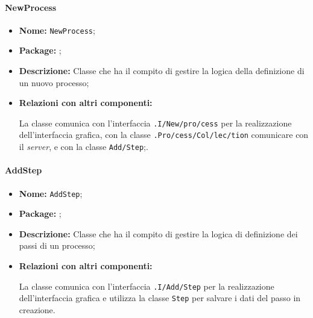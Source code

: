 \paragraph{NewProcess}
\begin{flushleft}
\begin{itemize}
\item \textbf{Nome:} \texttt{NewProcess};
\item \textbf{Package:} \texttt{\logicAdmin{}};
\item \textbf{Descrizione:} Classe che ha il compito di gestire la logica della definizione di un nuovo processo;
\item \textbf{Relazioni con altri componenti:}
\begin{sloppypar}
La classe comunica con l'interfaccia \texttt{\viewAdmin{}.I\fshyp{}New\fshyp{}pro\fshyp{}cess} per la realizzazione dell'interfaccia grafica, con la classe \texttt{\collectionp{}.Pro\fshyp{}cess\fshyp{}Col\fshyp{}lec\fshyp{}tion} comunicare con il \textit{server}, e con la classe \texttt{\logicAdmin{}Add\fshyp{}Step};.
\end{sloppypar}
\end{itemize}
\end{flushleft}

\paragraph{AddStep}
\begin{flushleft}
\begin{itemize}
\item \textbf{Nome:} \texttt{AddStep};
\item \textbf{Package:} \texttt{\logicAdmin{}};
\item \textbf{Descrizione:} Classe che ha il compito di gestire la logica di definizione dei passi di un processo;
\item \textbf{Relazioni con altri componenti:}
\begin{sloppypar}
La classe comunica con l'interfaccia \texttt{\viewAdmin{}.I\fshyp{}Add\fshyp{}Step} per la realizzazione dell'interfaccia grafica e utilizza la classe \texttt{\model{}Step} per salvare i dati del passo in creazione.
\end{sloppypar}
\end{itemize}
\end{flushleft}

